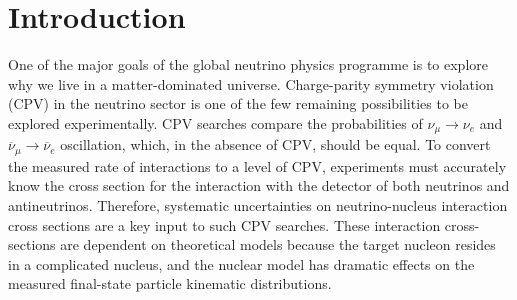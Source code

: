 \section{Introduction}

One of the major goals of the global neutrino physics programme is to explore why we live in a matter-dominated universe. Charge-parity symmetry violation (CPV) in the neutrino sector is one of the few remaining possibilities to be explored experimentally. 
CPV searches compare the probabilities of $\nu_{\mu}\!\rightarrow\!\nu_e$ and $\overline{\nu}_{\mu}\!\rightarrow\!\overline{\nu}_e$ oscillation, which, in the absence of CPV, should be equal. 
To convert the measured rate of interactions to a level of CPV, experiments must accurately know the cross section for the interaction with the detector of both neutrinos and antineutrinos. 
Therefore, systematic uncertainties on neutrino-nucleus interaction cross sections are a key input to such CPV searches.  
These interaction cross-sections are dependent on theoretical models because the target nucleon resides in a complicated nucleus, and the nuclear model has dramatic effects on the measured final-state particle kinematic distributions.

